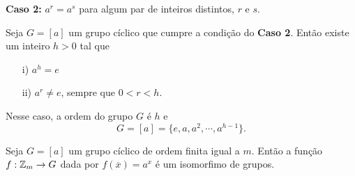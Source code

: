\documentclass{beamer}
\begin{document}
    \begin{frame}
        \textbf{Caso 2:} $a^r = a^s$ para algum par de inteiros distintos, $r$ e $s$.
    \end{frame}

    \begin{frame}
        \begin{proposicao}
            Seja $G = [a]$ um grupo cíclico que cumpre a condição do \textbf{Caso 2}. Então existe um inteiro $h > 0$ tal que
            \begin{enumerate}
                \item[i)] $a^h = e$

                \item[ii)] $a^r \ne e$, sempre que $0 < r < h$.
            \end{enumerate}
            Nesse caso, a ordem do grupo $G$ é $h$ e
            \[
                G = [a] = \{e, a, a^2, \cdots, a^{h - 1}\}.
            \]
        \end{proposicao}

        \begin{corolario}
            Seja $G = [a]$ um grupo cíclico de ordem finita igual a $m$. Então a função $f : \mathbb{Z}_m \to G$ dada por $f(\overline{x}) = a^x$ é um isomorfimo de grupos.
        \end{corolario}
    \end{frame}
\end{document}
